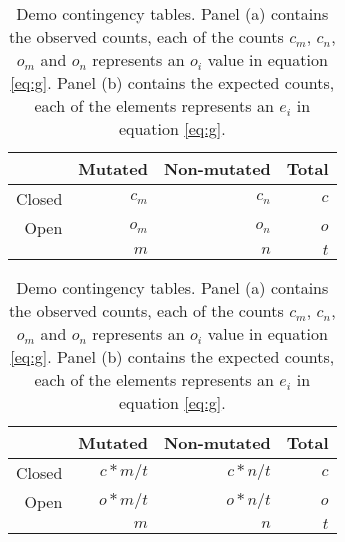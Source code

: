 \begin{table}[!htb]
    \caption{Demo contingency tables. Panel (a) contains the observed counts, each of the counts $c_m$, $c_n$, $o_m$ and $o_n$ represents an $o_i$ value in equation \ref{eq:g}. Panel (b) contains the expected counts, each of the elements represents an $e_i$ in equation \ref{eq:g}.}
    \begin{subtable}[!h]{.5\textwidth}
        \centering
        \begin{tabular}{r|rr|r}
             & Mutated & Non-mutated & Total  \\
        \hline
            Closed & $c_m$ & $c_n$ & $c$ \\
            Open & $o_m$ & $o_n$ & $o$ \\
        \hline    
             & $m$ & $n$ & $t$ \\
        \end{tabular}
    \label{tab:count_obs_demo}
    \end{subtable} 
    \quad %
    \begin{subtable}[!h]{.5\textwidth}
        \centering
        \begin{tabular}{r|rr|r}
             & Mutated & Non-mutated & Total  \\
        \hline     
            Closed & $c*m/t$ & $c*n/t$ & $c$ \\
            Open & $o*m/t$ & $o*n/t$ & $o$ \\
        \hline    
             & $m$ & $n$ & $t$ \\
        \end{tabular}
    \label{tab:count_exp_demo}
    \end{subtable}    
\end{table}